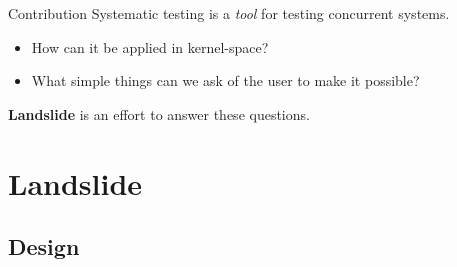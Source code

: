\documentclass[xcolor=dvipsnames]{beamer}
\begin{document}
\begin{frame}{Contribution} %
	Systematic testing is a {\em tool} for testing concurrent systems.
	\begin{itemize}
		\item How can it be applied in kernel-space?
		\item What simple things can we ask of the user to make it possible?
	\end{itemize}
	\linegap

	{\bf Landslide} is an effort to answer these questions.
\end{frame}

\section{Landslide}

\newcommand\done[1]{\textcolor{gray}{\em \small #1}}

%
%
%

\subsection{Design}
\end{document}
